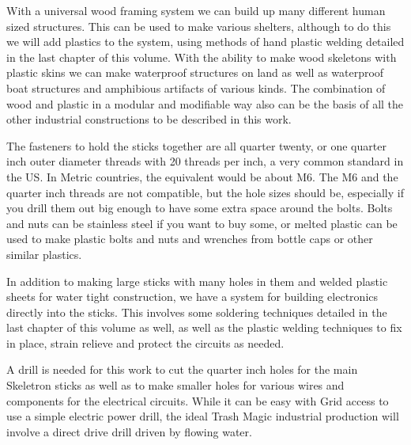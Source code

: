 With a universal wood framing system we can build up many different
human sized structures. This can be used to make various shelters,
although to do this we will add plastics to the system, using methods of
hand plastic welding detailed in the last chapter of this volume. With
the ability to make wood skeletons with plastic skins we can make
waterproof structures on land as well as waterproof boat structures and
amphibious artifacts of various kinds. The combination of wood and
plastic in a modular and modifiable way also can be the basis of all the
other industrial constructions to be described in this work.

The fasteners to hold the sticks together are all quarter twenty, or one
quarter inch outer diameter threads with 20 threads per inch, a very
common standard in the US. In Metric countries, the equivalent would be
about M6. The M6 and the quarter inch threads are not compatible, but
the hole sizes should be, especially if you drill them out big enough to
have some extra space around the bolts. Bolts and nuts can be stainless
steel if you want to buy some, or melted plastic can be used to make
plastic bolts and nuts and wrenches from bottle caps or other similar
plastics.

In addition to making large sticks with many holes in them and welded
plastic sheets for water tight construction, we have a system for
building electronics directly into the sticks. This involves some
soldering techniques detailed in the last chapter of this volume as
well, as well as the plastic welding techniques to fix in place, strain
relieve and protect the circuits as needed.

A drill is needed for this work to cut the quarter inch holes for the
main Skeletron sticks as well as to make smaller holes for various wires
and components for the electrical circuits. While it can be easy with
Grid access to use a simple electric power drill, the ideal Trash Magic
industrial production will involve a direct drive drill driven by
flowing water.

